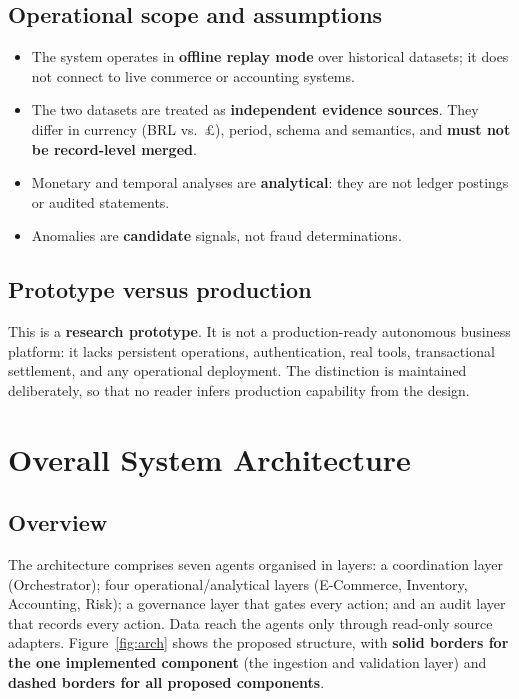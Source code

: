 \documentclass[11pt,a4paper]{article}
\begin{document}
\subsection{Operational scope and assumptions}
\begin{itemize}
\item The system operates in \textbf{offline replay mode} over historical datasets; it does not connect to live commerce or accounting systems.
\item The two datasets are treated as \textbf{independent evidence sources}. They differ in currency (BRL vs.\ \pounds), period, schema and semantics, and \textbf{must not be record-level merged}.
\item Monetary and temporal analyses are \textbf{analytical}: they are not ledger postings or audited statements.
\item Anomalies are \textbf{candidate} signals, not fraud determinations.
\end{itemize}

\subsection{Prototype versus production}
This is a \textbf{research prototype}. It is not a production-ready autonomous business platform: it lacks persistent operations, authentication, real tools, transactional settlement, and any operational deployment. The distinction is maintained deliberately, so that no reader infers production capability from the design.

\section{Overall System Architecture}
\subsection{Overview}
The architecture comprises seven agents organised in layers: a coordination layer (Orchestrator); four operational/analytical layers (E-Commerce, Inventory, Accounting, Risk); a governance layer that gates every action; and an audit layer that records every action. Data reach the agents only through read-only source adapters. Figure~\ref{fig:arch} shows the proposed structure, with \textbf{solid borders for the one implemented component} (the ingestion and validation layer) and \textbf{dashed borders for all proposed components}.
\end{document}
